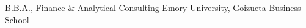 

\begin{cventries}

  \cventry
    {B.B.A., Finance \& Analytical Consulting} %
    {Emory University, Goizueta Business School} %
    {} %
    {} %
    {}
\end{cventries}

